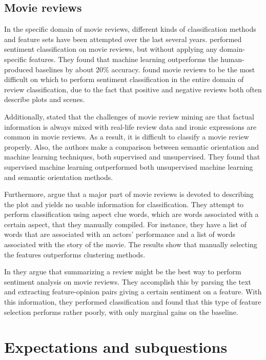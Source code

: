\documentclass[
10pt, %
a4paper, %
oneside, %
headinclude,footinclude, %
] {book}%
\begin{document}
\subsection{Movie reviews}

In the specific domain of movie reviews, different kinds of classification methods and feature sets have been attempted over the last several years. \citet{pang2002thumbs} performed sentiment classification on movie reviews, but without applying any domain-specific features. They found that machine learning outperforms the human-produced baselines by about 20\% accuracy. \citet{turney2002thumbs} found movie reviews to be the most difficult on which to perform sentiment classification in the entire domain of review classification, due to the fact that positive and negative reviews both often describe plots and scenes.

Additionally, \citet{chaovalit2005movie} stated that the challenges of movie review mining are that factual information is always mixed with real-life review data and ironic expressions are common in movie reviews. As a result, it is difficult to classify a movie review properly. Also, the authors make a comparison between semantic orientation and machine learning techniques, both supervised and unsupervised. They found that supervised machine learning outperformed both unsupervised machine learning and semantic orientation methods.

\newpage

Furthermore, \citet{anand2016semi} argue that a major part of movie reviews is devoted to describing the plot and yields no usable information for classification. They attempt to perform classification using aspect clue words, which are words associated with a certain aspect, that they manually compiled. For instance, they have a list of words that are associated with an actors' performance and a list of words associated with the story of the movie. The results show that manually selecting the features outperforms clustering methods.

In \citet{zhuang2006movie} they argue that summarizing a review might be the best way to perform sentiment analysis on movie reviews. They accomplish this by parsing the text and extracting feature-opinion pairs giving a certain sentiment on a feature. With this information, they performed classification and found that this type of feature selection performs rather poorly, with only marginal gains on the baseline.

\section{Expectations and subquestions}
\end{document}
